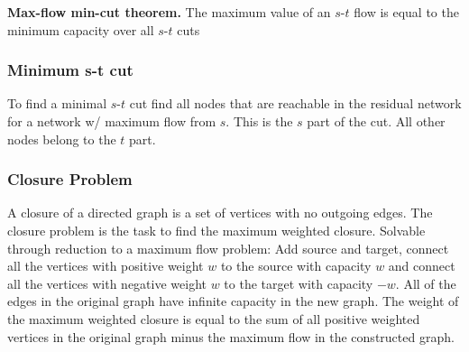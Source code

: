 \textbf{Max-flow min-cut theorem.} The maximum value of an $s$-$t$ flow is
equal to the minimum capacity over all $s$-$t$ cuts


\subsubsection{Minimum s-t cut}

To find a minimal $s$-$t$ cut find all nodes that are reachable in the
residual network for a network w/ maximum flow from $s$.  This is the
$s$ part of the cut.  All other nodes belong to the $t$ part.

\subsubsection{Closure Problem}

A closure of a directed graph is a set of vertices with no outgoing
edges.  The closure problem is the task to find the maximum weighted
closure.  Solvable through reduction to a maximum flow problem: Add
source and target, connect all the vertices with positive weight $w$
to the source with capacity $w$ and connect all the vertices with
negative weight $w$ to the target with capacity $-w$.  All of the
edges in the original graph have infinite capacity in the new
graph.  The weight of the maximum weighted closure is equal to the sum
of all positive weighted vertices in the original graph minus the
maximum flow in the constructed graph.

